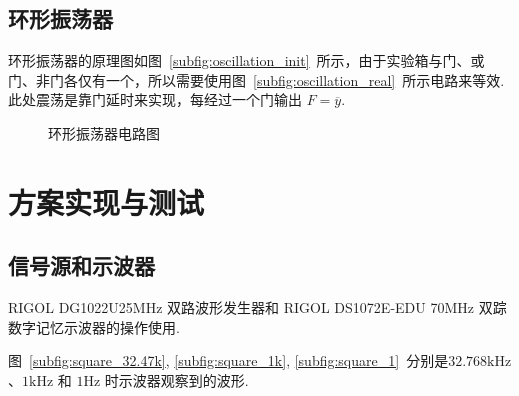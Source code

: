 \documentclass[11pt]{SEU-Digital-Report}
\begin{document}
        \subsection{环形振荡器}

            环形振荡器的原理图如图~\ref{subfig:oscillation_init}~所示，由于实验箱与门、或门、非门各仅有一个，所以需要使用图~\ref{subfig:oscillation_real}~所示电路来等效.
            此处震荡是靠门延时来实现，每经过一个门输出 $F=\overline{y}$.

            \begin{figure}[htbp]
                \centering
                \caption{环形振荡器电路图}
                \label{fig:oscillation_circuit}
            \end{figure}

            \vspace{-1cm}

    \section{方案实现与测试}

        \subsection{信号源和示波器}

            RIGOL DG1022U25MHz 双路波形发生器和 RIGOL DS1072E-EDU
            70MHz 双踪数字记忆示波器的操作使用.

            图~\ref{subfig:square_32.47k}, \ref{subfig:square_1k}, \ref{subfig:square_1}~分别是$32.768\mathrm{kHz}$、$1\mathrm{kHz}$ 和 $1\mathrm{Hz}$ 时示波器观察到的波形.
\end{document}
